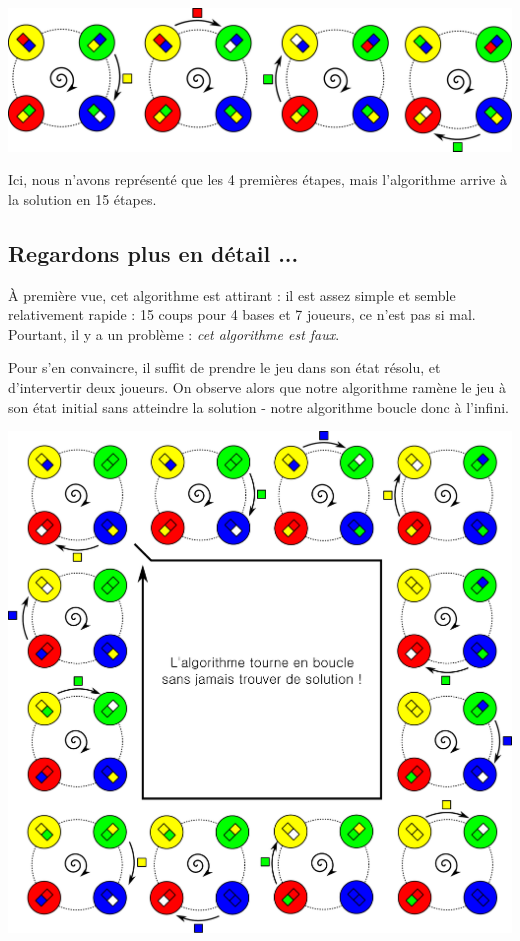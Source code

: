 \documentclass[a5paper,pagesize,DIV=14]{scrbook}
\begin{document}
\begin{center}
  \includegraphics[width=\linewidth]{img/baseball_ex1.pdf}
\end{center}

Ici, nous n'avons représenté que les 4 premières étapes, mais l'algorithme arrive à la solution en 15 étapes.

\subsection*{Regardons plus en détail ...}

À première vue, cet algorithme est attirant : il est assez simple et semble relativement rapide : 15 coups pour 4 bases et 7 joueurs, ce n'est pas si mal. Pourtant, il y a un problème : \textit{cet algorithme est faux}. 

Pour s'en convaincre, il suffit de prendre le jeu dans son état résolu, et d'intervertir deux joueurs. On observe alors que notre algorithme ramène le jeu à son état initial sans atteindre la solution - notre algorithme boucle donc à l'infini.

\begin{center}
  \includegraphics[width=\linewidth]{img/baseball_ex2.pdf}
\end{center}
\end{document}

